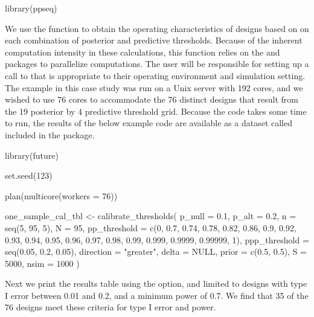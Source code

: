 \begin{Schunk}
\begin{Sinput}
library(ppseq)
\end{Sinput}
\end{Schunk}

We use the  function to obtain the
operating characteristics of designs based on on each combination of
posterior and predictive thresholds. Because of the inherent computation
intensity in these calculations, this function relies on the
 \citep{Bengtsson2020} and 
\citep{Vaughan2021} packages to parallelize computations. The user will
be responsible for setting up a call to  that is
appropriate to their operating environment and simulation setting. The
example in this case study was run on a Unix server with 192 cores, and
we wished to use 76 cores to accommodate the 76 distinct designs that
result from the 19 posterior by 4 predictive threshold grid. Because the
code takes some time to run, the results of the below example code are
available as a dataset called  included in
the  package.

\begin{Schunk}
\begin{Sinput}
library(future)

set.seed(123)

plan(multicore(workers = 76))

one_sample_cal_tbl <- 
  calibrate_thresholds(
    p_null = 0.1, 
    p_alt = 0.2, 
    n = seq(5, 95, 5),
    N = 95, 
    pp_threshold = c(0, 0.7, 0.74, 0.78, 0.82, 0.86, 0.9, 0.92, 0.93, 0.94, 
                     0.95, 0.96, 0.97, 0.98, 0.99, 0.999, 0.9999, 0.99999, 1),
    ppp_threshold = seq(0.05, 0.2, 0.05),
    direction = "greater", 
    delta = NULL, 
    prior = c(0.5, 0.5), 
    S = 5000, 
    nsim = 1000
    )
\end{Sinput}
\end{Schunk}

Next we print the results table using the  option, and
limited to designs with type I error between 0.01 and 0.2, and a minimum
power of 0.7. We find that 35 of the 76 designs meet these criteria for
type I error and power.

